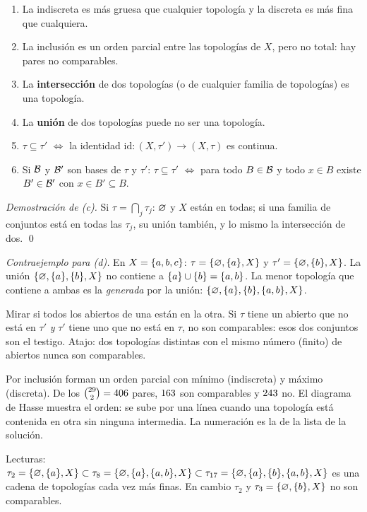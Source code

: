 \begin{teorema}
\begin{enumerate}[label=(\alph*),leftmargin=1.9em]
\item La indiscreta es más gruesa que cualquier topología y la discreta es más fina que cualquiera.
\item La inclusión es un orden parcial entre las topologías de $X$, pero no total: hay pares no comparables.
\item La \textbf{intersección} de dos topologías (o de cualquier familia de topologías) es una topología.
\item La \textbf{unión} de dos topologías puede no ser una topología.
\item $\tau\subseteq\tau'$ $\iff$ la identidad $\mathrm{id}:(X,\tau')\to(X,\tau)$ es continua.
\item Si $\mathcal{B}$ y $\mathcal{B}'$ son bases de $\tau$ y $\tau'$: $\tau\subseteq\tau'$ $\iff$ para todo $B\in\mathcal{B}$ y todo $x\in B$
existe $B'\in\mathcal{B}'$ con $x\in B'\subseteq B$.
\end{enumerate}
\end{teorema}
\emph{Demostración de (c).} Si $\tau=\bigcap_j\tau_j$: $\varnothing$ y $X$ están en todas; si una familia de conjuntos está en
todas las $\tau_j$, su unión también, y lo mismo la intersección de dos. \qed

\emph{Contraejemplo para (d).} En $X=\{a,b,c\}$: $\tau=\{\varnothing,\{a\},X\}$ y $\tau'=\{\varnothing,\{b\},X\}$. La unión
$\{\varnothing,\{a\},\{b\},X\}$ no contiene a $\{a\}\cup\{b\}=\{a,b\}$. La menor topología que contiene a ambas es la
\emph{generada} por la unión: $\{\varnothing,\{a\},\{b\},\{a,b\},X\}$.

\begin{metodo}
Mirar si todos los abiertos de una están en la otra. Si $\tau$ tiene un abierto que no está en $\tau'$ \emph{y}
$\tau'$ tiene uno que no está en $\tau$, no son comparables: esos dos conjuntos son el testigo. Atajo: dos topologías
distintas con el mismo número (finito) de abiertos nunca son comparables.
\end{metodo}

\begin{ejemplo}
Por inclusión forman un orden parcial con mínimo (indiscreta) y máximo (discreta). De los $\binom{29}{2}=406$
pares, $163$ son comparables y $243$ no. El diagrama de Hasse muestra el orden: se sube por una línea
cuando una topología está contenida en otra sin ninguna intermedia. La numeración es la de la lista de la solución.
\begin{center}\resizebox{0.92\linewidth}{!}{}\end{center}
Lecturas: $\tau_2=\{\varnothing,\{a\},X\}\subset\tau_8=\{\varnothing,\{a\},\{a,b\},X\}\subset\tau_{17}=\{\varnothing,\{a\},\{b\},\{a,b\},X\}$
es una cadena de topologías cada vez más finas. En cambio $\tau_2$ y $\tau_3=\{\varnothing,\{b\},X\}$ no son comparables.
\end{ejemplo}

